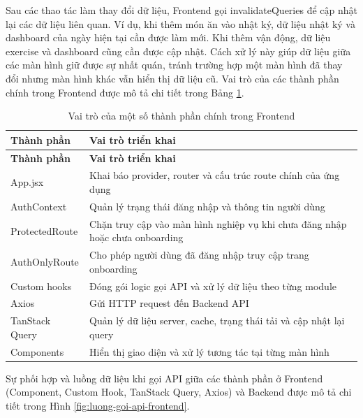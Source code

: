 \documentclass[12pt, a4paper]{report}
\begin{document}
Sau các thao tác làm thay đổi dữ liệu, Frontend gọi invalidateQueries để cập nhật lại các dữ liệu liên quan. Ví dụ, khi thêm món ăn vào nhật ký, dữ liệu nhật ký và dashboard của ngày hiện tại cần được làm mới. Khi thêm vận động, dữ liệu exercise và dashboard cũng cần được cập nhật. Cách xử lý này giúp dữ liệu giữa các màn hình giữ được sự nhất quán, tránh trường hợp một màn hình đã thay đổi nhưng màn hình khác vẫn hiển thị dữ liệu cũ. Vai trò của các thành phần chính trong Frontend được mô tả chi tiết trong Bảng \ref{tab:thanh_phan_frontend}.

\begin{longtable}{|>{\raggedright\arraybackslash}p{5cm}|p{10cm}|}
\caption{Vai trò của một số thành phần chính trong Frontend}
\label{tab:thanh_phan_frontend} \\
\hline
\textbf{Thành phần} & \textbf{Vai trò triển khai} \\
\hline
\endfirsthead
\hline
\textbf{Thành phần} & \textbf{Vai trò triển khai} \\
\hline
\endhead

App.jsx & Khai báo provider, router và cấu trúc route chính của ứng dụng \\
\hline
AuthContext & Quản lý trạng thái đăng nhập và thông tin người dùng \\
\hline
ProtectedRoute & Chặn truy cập vào màn hình nghiệp vụ khi chưa đăng nhập hoặc chưa onboarding \\
\hline
AuthOnlyRoute & Cho phép người dùng đã đăng nhập truy cập trang onboarding \\
\hline
Custom hooks & Đóng gói logic gọi API và xử lý dữ liệu theo từng module \\
\hline
Axios & Gửi HTTP request đến Backend API \\
\hline
TanStack Query & Quản lý dữ liệu server, cache, trạng thái tải và cập nhật lại query \\
\hline
Components & Hiển thị giao diện và xử lý tương tác tại từng màn hình \\
\hline
\end{longtable}

Sự phối hợp và luồng dữ liệu khi gọi API giữa các thành phần ở Frontend (Component, Custom Hook, TanStack Query, Axios) và Backend được mô tả chi tiết trong Hình \ref{fig:luong-goi-api-frontend}.
\end{document}
